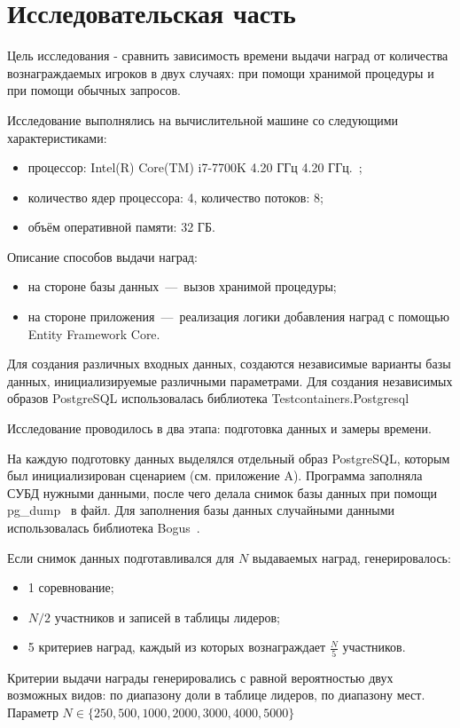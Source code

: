 \chapter{Исследовательская часть}
Цель исследования - сравнить зависимость времени выдачи наград от количества вознаграждаемых игроков в двух случаях: при помощи хранимой процедуры и при помощи обычных
запросов.

Исследование выполнялись на вычислительной машине со следующими характеристиками:
\begin{itemize}
	\item процессор: Intel(R) Core(TM) i7-7700K 4.20 ГГц 4.20 ГГц.~\cite{intel};
	\item количество ядер процессора: 4, количество потоков: 8;
	\item объём оперативной памяти: 32 ГБ.
\end{itemize}

Описание способов выдачи наград:
\begin{itemize}
	\item на стороне базы данных~---~вызов хранимой процедуры;
	\item на стороне приложения~---~реализация логики добавления наград с помощью Entity Framework Core.
\end{itemize}

Для создания различных входных данных, создаются независимые варианты базы данных, инициализируемые различными параметрами. Для создания независимых образов PostgreSQL использовалась библиотека Testcontainers.Postgresql~\cite{testcontainers}

Исследование проводилось в два этапа: подготовка данных и замеры времени.

На каждую подготовку данных выделялся отдельный образ PostgreSQL, которым был инициализирован сценарием (см. приложение A). Программа заполняла СУБД нужными данными, после чего делала снимок базы данных при помощи pg\_dump~\cite{postgresql_pgdump} в файл. Для заполнения базы данных случайными данными использовалась библиотека Bogus~\cite{bogus}.

Если снимок данных подготавливался для $N$ выдаваемых наград, генерировалось:
\begin{itemize}
	\item 1 соревнование;
	\item $N/2$ участников и записей в таблицы лидеров;
	\item 5 критериев наград, каждый из которых вознаграждает $\frac{N}{5}$ участников.
\end{itemize}
Критерии выдачи награды генерировались с равной вероятностью двух возможных видов: по диапазону доли в таблице лидеров, по диапазону мест. Параметр $N \in \{250, 500, 1000, 2000, 3000, 4000, 5000\}$

